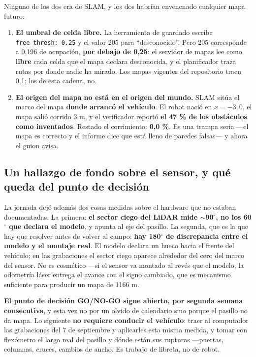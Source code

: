 \documentclass[12pt,letterpaper]{article}
\begin{document}
Ninguno de los dos era de SLAM, y los dos habrían envenenado cualquier mapa futuro:

\begin{enumerate}[leftmargin=*]
    \item \textbf{El umbral de celda libre.} La herramienta de guardado escribe \texttt{free\_thresh: 0.25} y el valor 205 para ``desconocido''. Pero 205 corresponde a 0,196 de ocupación, \textbf{por debajo de 0,25}: el servidor de mapas lee como \textbf{libre} cada celda que el mapa declara desconocida, y el planificador traza rutas por donde nadie ha mirado. Los mapas vigentes del repositorio traen 0,1; los de esta cadena, no.

    \item \textbf{El origen del mapa no está en el origen del mundo.} SLAM sitúa el marco del mapa \textbf{donde arrancó el vehículo}. El robot nació en $x = -3{,}0$, el mapa salió corrido 3 m, y el verificador reportó \textbf{el 47 \% de los obstáculos como inventados}. Restado el corrimiento: \textbf{0,0 \%}. Es una trampa seria ---el mapa es correcto y el informe dice que está lleno de paredes falsas--- y ahora el guion avisa.
\end{enumerate}

\subsection{Un hallazgo de fondo sobre el sensor, y qué queda del punto de decisión}

La jornada dejó además dos cosas medidas sobre el hardware que no estaban documentadas. La primera: \textbf{el sector ciego del LiDAR mide $\sim$90$^\circ$, no los 60$^\circ$ que declara el modelo}, y apunta al eje del pasillo. La segunda, que es la que hay que resolver antes de volver al campo: \textbf{hay 180$^\circ$ de discrepancia entre el modelo y el montaje real}. El modelo declara un hueco hacia el frente del vehículo; en las grabaciones el sector ciego aparece alrededor del cero del marco del sensor. No es cosmético ---si el sensor va montado al revés que el modelo, la odometría láser entrega el avance con el signo cambiado, que es mecanismo suficiente para producir un mapa de 1166 m.

\textbf{El punto de decisión GO/NO-GO sigue abierto, por segunda semana consecutiva}, y esta vez no por un olvido de calendario sino porque el pasillo no da mapa. Lo siguiente \textbf{no requiere conducir el vehículo}: traer al computador las grabaciones del 7 de septiembre y aplicarles esta misma medida, y tomar con flexómetro el largo real del pasillo y dónde están sus rupturas ---puertas, columnas, cruces, cambios de ancho. Es trabajo de libreta, no de robot.
\end{document}
